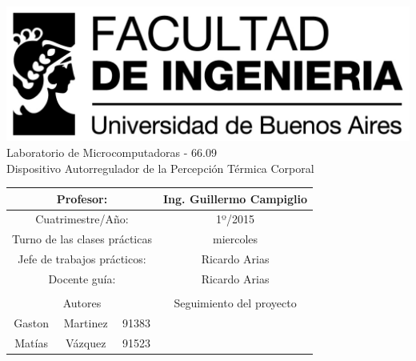 \documentclass[10pt,spanish,a4paper,openany,notitlepage]{article}
\begin{document}
\begin{titlepage}
\begin{center}
\includegraphics[scale=0.5]{imagenes/FIUBA_ALTA.jpg}\\
\large{Laboratorio de Microcomputadoras  -  66.09}
\vspace{1cm}\\
\Huge{Dispositivo Autorregulador de la Percepción Térmica Corporal}\\
\vspace{7mm}
\normalsize
\begin{tabular}{|c|c|c|c|c|c|c|c|c|c|c|c|}
\hline
\multicolumn{3}{|c|}{Profesor:}  & \multicolumn{9}{|c|}{Ing. Guillermo Campiglio}\\
\hline
\multicolumn{3}{|c|}{Cuatrimestre/Año:}  & \multicolumn{9}{|c|}{1º/2015}\\
\hline
\multicolumn{3}{|c|}{Turno de las clases prácticas}  & \multicolumn{9}{|c|}{miercoles}\\
\hline
\multicolumn{3}{|c|}{Jefe de trabajos prácticos:}  & \multicolumn{9}{|c|}{Ricardo Arias}\\
\hline
\multicolumn{3}{|c|}{Docente guía:}  & \multicolumn{9}{|c|}{Ricardo Arias}\\
\hline
\multicolumn{12}{|c|}{}\\
\hline
\multicolumn{3}{|c|}{Autores}  & \multicolumn{9}{|c|}{Seguimiento del proyecto}\\
\hline
Gaston & Martinez & 91383 & \hspace{4mm} & \hspace{4mm} & \hspace{4mm} & \hspace{4mm} &\hspace{4mm} &\hspace{4mm} &\hspace{4mm} &\hspace{4mm} &\hspace{4mm} \\
\hline
Matías & Vázquez  & 91523& \hspace{4mm} & \hspace{4mm} & \hspace{4mm} & \hspace{4mm} &\hspace{4mm} &\hspace{4mm} &\hspace{4mm} &\hspace{4mm} &\hspace{4mm} \\
\hline
\end{tabular}


\end{center}
\end{titlepage}
\end{document}
